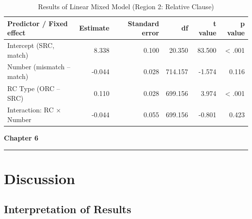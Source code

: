 \documentclass[
]{article}
\begin{document}
\vspace{1em}

\begin{table}[!h]
\centering
\caption{\label{tab:Table7_LMM}Results of Linear Mixed Model (Region 2: Relative Clause)}
\centering
\begin{tabular}[t]{lrrrrr}
\toprule
Predictor / Fixed effect & Estimate & Standard error & df & t value & p value\\
\midrule
Intercept (SRC, match) & 8.338 & 0.100 & 20.350 & 83.500 & \textless{} .001\\
Number (mismatch – match) & -0.044 & 0.028 & 714.157 & -1.574 & 0.116\\
RC Type (ORC – SRC) & 0.110 & 0.028 & 699.156 & 3.974 & \textless{} .001\\
Interaction: RC × Number & -0.044 & 0.055 & 699.156 & -0.801 & 0.423\\
\bottomrule
\end{tabular}
\end{table}

\newpage

\clearpage
\thispagestyle{empty}  %
\vspace*{-1cm}
\begin{flushleft}
\Huge \textbf{Chapter 6}
\end{flushleft}
\vspace{0.3cm}
\noindent\rule{\linewidth}{0.6pt}
\pagestyle{fancy}  %

\section{Discussion}\label{discussion}

\subsection{Interpretation of Results}\label{interpretation-of-results}
\end{document}
